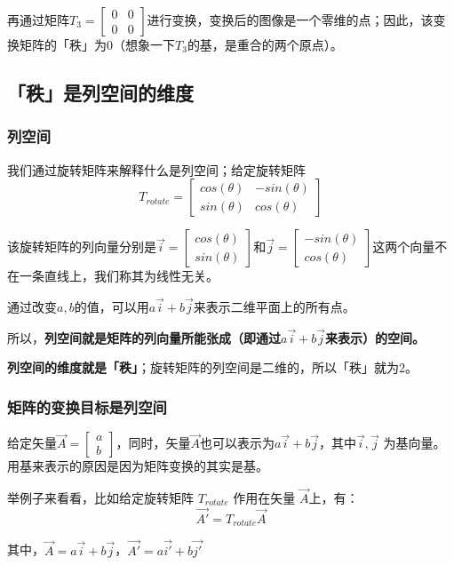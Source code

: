 \documentclass[12pt]{article}
\begin{document}
再通过矩阵$T_3=\begin{bmatrix}0&0\\0&0\end{bmatrix}$进行变换，变换后的图像是一个零维的点；因此，该变换矩阵的「秩」为0（想象一下$T_3$的基，是重合的两个原点）。

\subsection{「秩」是列空间的维度}
\subsubsection{列空间}
我们通过旋转矩阵来解释什么是列空间；给定旋转矩阵
$$
T_{rotate}=
\begin{bmatrix}
    cos(\theta) & -sin(\theta)\\
    sin(\theta) & cos(\theta)
\end{bmatrix}
$$

该旋转矩阵的列向量分别是$\vec{i}=\begin{bmatrix}cos(\theta)\\sin(\theta)\end{bmatrix}$和$\vec{j}=\begin{bmatrix}-sin(\theta)\\cos(\theta)\end{bmatrix}$这两个向量不在一条直线上，我们称其为线性无关。

通过改变$a,b$的值，可以用$a\vec{i} + b\vec{j}$来表示二维平面上的所有点。

所以，\textbf{列空间就是矩阵的列向量所能张成（即通过$a\vec{i} + b\vec{j}$来表示）的空间。}

\textbf{列空间的维度就是「秩」}；旋转矩阵的列空间是二维的，所以「秩」就为2。

\subsubsection{矩阵的变换目标是列空间}
给定矢量$\vec{A} = \begin{bmatrix}a\\b\end{bmatrix}$，同时，矢量$\vec{A}$也可以表示为$a\vec{i}+b\vec{j}$，其中$\vec{i},\vec{j}$ 为基向量。用基来表示的原因是因为矩阵变换的其实是基。

举例子来看看，比如给定旋转矩阵 $T_{rotate}$ 作用在矢量 $\vec{A}$上，有：
$$
\vec{A'} = T_{rotate}\vec{A}
$$

其中，$\vec{A} = a\vec{i} + b\vec{j}$，$\vec{A'} = a\vec{i'} + b\vec{j'}$
\end{document}
